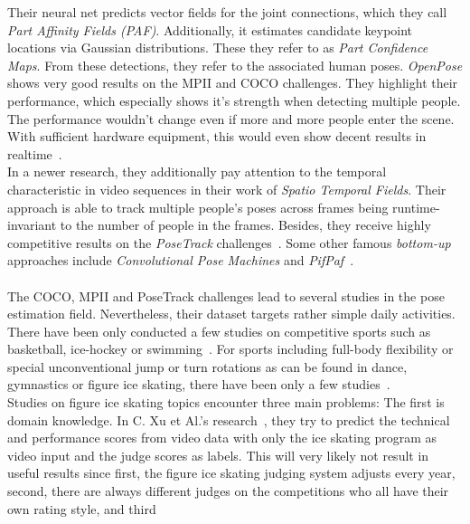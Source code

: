     Their neural net predicts vector fields for the joint connections, which they call \textit{Part Affinity Fields (PAF)}.
    Additionally, it estimates candidate keypoint locations via Gaussian distributions.
    These they refer to as \textit{Part Confidence Maps}.
    From these detections, they refer to the associated human poses.
    \textit{OpenPose} shows very good results on the MPII and COCO challenges.
    They highlight their performance, which especially shows it's strength when detecting multiple people.
    The performance wouldn't change even if more and more people enter the scene.
    With sufficient hardware equipment, this would even show decent results in realtime~\cite{openpose}.\\
    In a newer research, they additionally pay attention to the temporal characteristic in video sequences in
    their work of \textit{Spatio Temporal Fields}.
    Their approach is able to track multiple people's poses across frames being runtime-invariant to the number
    of people in the frames.
    Besides, they receive highly competitive results on the \textit{PoseTrack} challenges~\cite{staf}.
    Some other famous \textit{bottom-up} approaches include \textit{Convolutional Pose Machines} and
    \textit{PifPaf}~\cite{convpose, pifpaf}.
\\\mbox{}\\
    The COCO, MPII and PoseTrack challenges lead to several studies in the pose estimation field.
    Nevertheless, their dataset targets rather simple daily activities.
    There have been only conducted a few studies on competitive sports such as basketball, ice-hockey or
    swimming~\cite{synergetic, posehockey, swimm}.
    For sports including full-body flexibility or special unconventional jump or turn rotations as can be found
    in dance, gymnastics or figure ice skating,
    there have been only a few studies~\cite{dance, figureskatingsimulation, scorefigureskating, fsd10}.\\
    Studies on figure ice skating topics encounter three main problems:
    The first is domain knowledge.
    In C. {Xu} et Al.'s research~\cite{scorefigureskating}, they try to predict the technical and performance scores from video data with
    only the
    ice skating program as video input and the judge scores as labels.
    This will very likely not result in useful results since first, the figure ice skating judging system adjusts
    every year,
    second, there are always different judges on the competitions who all have their own rating style, and third
